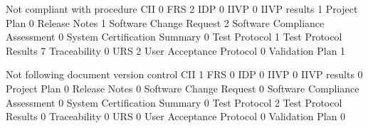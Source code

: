 \documentclass{article}
\begin{document}
\begin{Schunk}
\begin{Soutput}
                                 Not compliant with procedure
  CII                                                       0
  FRS                                                       2
  IDP                                                       0
  IIVP                                                      0
  IIVP results                                              1
  Project Plan                                              0
  Release Notes                                             1
  Software Change Request                                   2
  Software Compliance Assessment                            0
  System Certification Summary                              0
  Test Protocol                                             1
  Test Protocol Results                                     7
  Traceability                                              0
  URS                                                       2
  User Acceptance Protocol                                  0
  Validation Plan                                           1
                                
                                 Not following document version control
  CII                                                                 1
  FRS                                                                 0
  IDP                                                                 0
  IIVP                                                                0
  IIVP results                                                        0
  Project Plan                                                        0
  Release Notes                                                       0
  Software Change Request                                             0
  Software Compliance Assessment                                      0
  System Certification Summary                                        0
  Test Protocol                                                       2
  Test Protocol Results                                               0
  Traceability                                                        0
  URS                                                                 0
  User Acceptance Protocol                                            0
  Validation Plan                                                     0
                                

\end{Soutput}
\end{Schunk}
\end{document}
